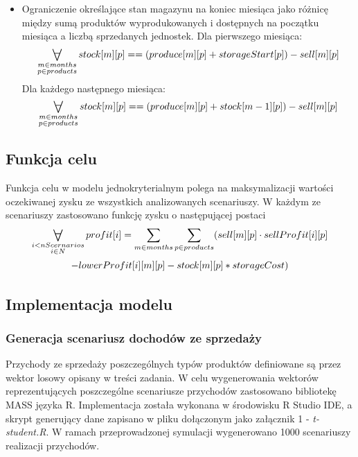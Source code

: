 \documentclass[11pt,a4paper]{article}
\newcommand\bigforall{%
  \mathop{\lower0.75ex\hbox{\ensuremath{%
    \mathlarger{\mathlarger{\mathlarger{\mathlarger{\forall}}}}}}}%
  \limits}
\begin{document}
\begin{itemize}
    \item Ograniczenie określające stan magazynu na koniec miesiąca jako różnicę między sumą produktów wyprodukowanych i dostępnych na początku miesiąca a liczbą sprzedanych jednostek. Dla pierwszego miesiąca:
	\begin{equation}
		\bigforall_{\substack{
			m \in months\\ 
			p \in products}} stock[m][p]==(produce[m][p] + storageStart[p])-sell[m][p]
	\end{equation}
	Dla każdego następnego miesiąca:
	\begin{equation}
		\bigforall_{\substack{
			m \in months\\ 
			p \in products}} stock[m][p]==(produce[m][p] + stock[m-1][p])-sell[m][p]
	\end{equation}

\end{itemize}
\subsection{Funkcja celu}
Funkcja celu w modelu jednokryterialnym polega na maksymalizacji wartości oczekiwanej zysku ze wszystkich analizowanych scenariuszy. W każdym ze scenariuszy zastosowano funkcję zysku o następującej postaci
\begin{multline}
\bigforall_{\substack{
			i<nScernarios\\ 
			i \in N}}  
	profit[i] =\sum_{m \in months} \sum_{p \in products}
		(sell[m][p]\cdot sellProfit[i][p] \\ -lowerProfit[i][m][p]-stock[m][p]*storageCost)
\end{multline}
 


\subsection{Implementacja modelu}
\subsubsection{Generacja scenariusz dochodów ze sprzedaży}
Przychody ze sprzedaży poszczególnych typów produktów definiowane są przez wektor losowy opisany w treści zadania. W celu wygenerowania wektorów reprezentujących poszczególne scenariusze przychodów zastosowano bibliotekę MASS języka R. Implementacja została wykonana w środowisku R Studio IDE, a skrypt generujący dane zapisano w pliku dołączonym jako załącznik 1 - \textit{t-student.R}. W ramach przeprowadzonej symulacji wygenerowano 1000 scenariuszy realizacji przychodów.
\end{document}
